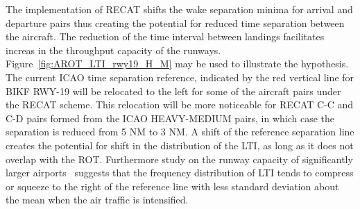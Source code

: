 
The implementation of RECAT shifts the wake separation minima for arrival and departure pairs thus creating the potential for reduced time separation between the aircraft. The reduction of the time interval between landings facilitates increas in the throughput capacity of the runways. 
Figure~\ref{fig:AROT_LTI_rwy19_H_M} may be used to illustrate the hypothesis. The current ICAO time separation reference, indicated by the red vertical line for BIKF RWY-19 will be relocated to the left for some of the aircraft pairs under the RECAT scheme. This relocation will be more noticeable for RECAT C-C and C-D pairs formed from the ICAO HEAVY-MEDIUM pairs, in which case the separation is reduced from 5 NM to 3 NM. A shift of the reference separation line creates the potential for shift in the distribution of the LTI, as long as it does not overlap with the ROT. Furthermore study on the runway capacity of significantly larger airports~\cite{kolos2013influence} suggests that the frequency distribution of LTI tends to compress or squeeze to the right of the reference line with less standard deviation about the mean when the air traffic is intensified.

